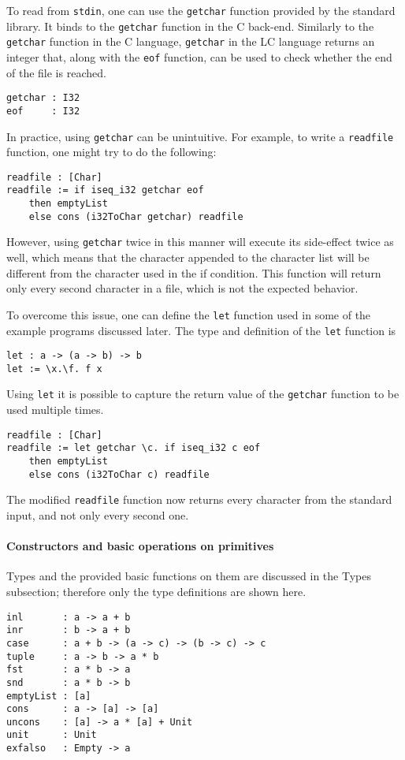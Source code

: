 \documentclass[12pt]{article}
\begin{document}
To read from \verb$stdin$, one can use the \verb$getchar$ function provided by
the standard library. It binds to the \verb$getchar$ function in the C back-end.
Similarly to the \verb$getchar$ function in the C language, \verb$getchar$ in
the LC language returns an integer that, along with the \verb$eof$ function, can
be used to check whether the end of the file is reached.
\begin{lstlisting}
getchar : I32
eof     : I32
\end{lstlisting}
In practice, using \verb$getchar$ can be unintuitive. For example, to write a 
\verb$readfile$ function, one might try to do the following:
\begin{lstlisting}
readfile : [Char]
readfile := if iseq_i32 getchar eof 
    then emptyList 
    else cons (i32ToChar getchar) readfile
\end{lstlisting}
However, using \verb$getchar$ twice in this manner will execute its side-effect
twice as well, which means that the character appended to the character list
will be different from the character used in the if condition. This function
will return only every second character in a file, which is not the expected
behavior.

To overcome this issue, one can define the \verb$let$ function used in some of
the example programs discussed later. The type and definition of the \verb$let$
function is
\begin{lstlisting}
let : a -> (a -> b) -> b
let := \x.\f. f x
\end{lstlisting}
Using \verb$let$ it is possible to capture the return value of the
\verb$getchar$ function to be used multiple times.
\begin{lstlisting}
readfile : [Char]
readfile := let getchar \c. if iseq_i32 c eof 
    then emptyList 
    else cons (i32ToChar c) readfile
\end{lstlisting}
The modified \verb$readfile$ function now returns every character from the
standard input, and not only every second one.

\paragraph{Constructors and basic operations on primitives} Types and the
provided basic functions on them are discussed in the Types subsection;
therefore only the type definitions are shown here.
\begin{lstlisting}
inl       : a -> a + b
inr       : b -> a + b
case      : a + b -> (a -> c) -> (b -> c) -> c
tuple     : a -> b -> a * b
fst       : a * b -> a
snd       : a * b -> b
emptyList : [a]
cons      : a -> [a] -> [a]
uncons    : [a] -> a * [a] + Unit
unit      : Unit
exfalso   : Empty -> a
\end{lstlisting}
\end{document}
